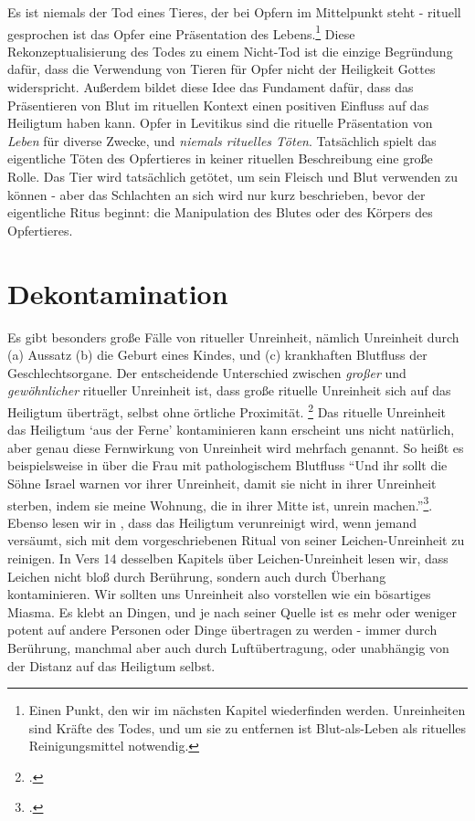 Es ist niemals der Tod eines Tieres, der bei Opfern im Mittelpunkt steht - rituell gesprochen ist das Opfer eine Präsentation des Lebens.\footnote{
Einen Punkt, den wir im nächsten Kapitel wiederfinden werden.
Unreinheiten sind Kräfte des Todes, und um sie zu entfernen ist Blut-als-Leben als rituelles Reinigungsmittel notwendig.}
Diese Rekonzeptualisierung des Todes zu einem Nicht-Tod ist die einzige Begründung dafür, dass die Verwendung von Tieren für Opfer nicht der Heiligkeit Gottes widerspricht.
Außerdem bildet diese Idee das Fundament dafür, dass das Präsentieren von Blut im rituellen Kontext einen positiven Einfluss auf das Heiligtum haben kann.
Opfer in Levitikus sind die rituelle Präsentation von \textit{Leben} für diverse Zwecke, und \textit{niemals rituelles Töten}.
Tatsächlich spielt das eigentliche Töten des Opfertieres in keiner rituellen Beschreibung eine große Rolle.
Das Tier wird tatsächlich getötet, um sein Fleisch und Blut verwenden zu können - aber das Schlachten an sich wird nur kurz beschrieben, bevor der eigentliche Ritus beginnt:
die Manipulation des Blutes oder des Körpers des Opfertieres.

\chapter{Dekontamination}
Es gibt besonders große Fälle von ritueller Unreinheit, nämlich
Unreinheit durch (a) Aussatz (b) die Geburt eines Kindes, und (c) krankhaften Blutfluss der Geschlechtsorgane.
Der entscheidende Unterschied zwischen \textit{großer} und \textit{gewöhnlicher} ritueller Unreinheit ist, dass große rituelle Unreinheit sich auf das Heiligtum überträgt, selbst ohne örtliche Proximität.
\Footcite[78f]{lamb-of-the-free}
Das rituelle Unreinheit das Heiligtum `aus der Ferne' kontaminieren kann erscheint uns nicht natürlich, aber genau diese Fernwirkung von Unreinheit wird mehrfach genannt.
So heißt es beispielsweise in  über die Frau mit pathologischem Blutfluss ``Und ihr sollt die Söhne Israel warnen vor ihrer Unreinheit, damit sie nicht in ihrer Unreinheit sterben, indem sie meine Wohnung, die in ihrer Mitte ist, unrein machen.''\Footcite{elb}.
Ebenso lesen wir in , dass das Heiligtum verunreinigt wird, wenn jemand versäumt, sich mit dem vorgeschriebenen Ritual von seiner Leichen-Unreinheit zu reinigen.
In Vers 14 desselben Kapitels über Leichen-Unreinheit lesen wir, dass Leichen nicht bloß durch Berührung, sondern auch durch Überhang kontaminieren.
Wir sollten uns Unreinheit also vorstellen wie ein bösartiges Miasma.
Es klebt an Dingen, und je nach seiner Quelle ist es mehr oder weniger potent auf andere Personen oder Dinge übertragen zu werden -
immer durch Berührung, manchmal aber auch durch Luftübertragung, oder unabhängig von der Distanz auf das Heiligtum selbst.


